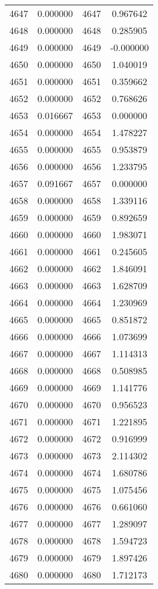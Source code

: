\documentclass[12pt]{article}
\begin{document}
\begin{longtable}{@{}cccc@{}}
4647 & 0.000000 & 4647 & 0.967642 \\
4648 & 0.000000 & 4648 & 0.285905 \\
4649 & 0.000000 & 4649 & -0.000000 \\
4650 & 0.000000 & 4650 & 1.040019 \\
4651 & 0.000000 & 4651 & 0.359662 \\
4652 & 0.000000 & 4652 & 0.768626 \\
4653 & 0.016667 & 4653 & 0.000000 \\
4654 & 0.000000 & 4654 & 1.478227 \\
4655 & 0.000000 & 4655 & 0.953879 \\
4656 & 0.000000 & 4656 & 1.233795 \\
4657 & 0.091667 & 4657 & 0.000000 \\
4658 & 0.000000 & 4658 & 1.339116 \\
4659 & 0.000000 & 4659 & 0.892659 \\
4660 & 0.000000 & 4660 & 1.983071 \\
4661 & 0.000000 & 4661 & 0.245605 \\
4662 & 0.000000 & 4662 & 1.846091 \\
4663 & 0.000000 & 4663 & 1.628709 \\
4664 & 0.000000 & 4664 & 1.230969 \\
4665 & 0.000000 & 4665 & 0.851872 \\
4666 & 0.000000 & 4666 & 1.073699 \\
4667 & 0.000000 & 4667 & 1.114313 \\
4668 & 0.000000 & 4668 & 0.508985 \\
4669 & 0.000000 & 4669 & 1.141776 \\
4670 & 0.000000 & 4670 & 0.956523 \\
4671 & 0.000000 & 4671 & 1.221895 \\
4672 & 0.000000 & 4672 & 0.916999 \\
4673 & 0.000000 & 4673 & 2.114302 \\
4674 & 0.000000 & 4674 & 1.680786 \\
4675 & 0.000000 & 4675 & 1.075456 \\
4676 & 0.000000 & 4676 & 0.661060 \\
4677 & 0.000000 & 4677 & 1.289097 \\
4678 & 0.000000 & 4678 & 1.594723 \\
4679 & 0.000000 & 4679 & 1.897426 \\
4680 & 0.000000 & 4680 & 1.712173 \\

\end{longtable}
\end{document}
